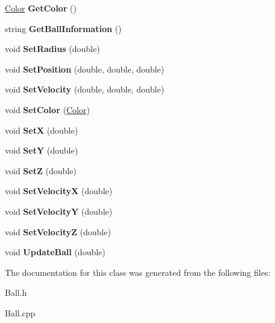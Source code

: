 \begin{DoxyCompactItemize}
\item 
\hypertarget{classBall_a8560830fd50768e3dea23ea6acb805e4}{\hyperlink{classColor}{Color} {\bfseries Get\+Color} ()}\label{classBall_a8560830fd50768e3dea23ea6acb805e4}

\item 
\hypertarget{classBall_a1262df24d9535780d0d1b5e84898873a}{string {\bfseries Get\+Ball\+Information} ()}\label{classBall_a1262df24d9535780d0d1b5e84898873a}

\item 
\hypertarget{classBall_a686405761606ff9cb10f3dec4c15f6c7}{void {\bfseries Set\+Radius} (double)}\label{classBall_a686405761606ff9cb10f3dec4c15f6c7}

\item 
\hypertarget{classBall_a9f7d9dd8c90321127eca7f74cf61898f}{void {\bfseries Set\+Position} (double, double, double)}\label{classBall_a9f7d9dd8c90321127eca7f74cf61898f}

\item 
\hypertarget{classBall_a5ae9588630dacbc7904c455bd5d8cd2a}{void {\bfseries Set\+Velocity} (double, double, double)}\label{classBall_a5ae9588630dacbc7904c455bd5d8cd2a}

\item 
\hypertarget{classBall_a3005173f0433ba7e4a17e3f17e17ad3f}{void {\bfseries Set\+Color} (\hyperlink{classColor}{Color})}\label{classBall_a3005173f0433ba7e4a17e3f17e17ad3f}

\item 
\hypertarget{classBall_ab568ff882cf687755620b05d23fcc0b2}{void {\bfseries Set\+X} (double)}\label{classBall_ab568ff882cf687755620b05d23fcc0b2}

\item 
\hypertarget{classBall_a908bf44a408752a5a57dca7208e88261}{void {\bfseries Set\+Y} (double)}\label{classBall_a908bf44a408752a5a57dca7208e88261}

\item 
\hypertarget{classBall_a605a95d9686caa17e94658ebd80134e2}{void {\bfseries Set\+Z} (double)}\label{classBall_a605a95d9686caa17e94658ebd80134e2}

\item 
\hypertarget{classBall_ac6b233f8bfa2f301639fcc47812a71a5}{void {\bfseries Set\+Velocity\+X} (double)}\label{classBall_ac6b233f8bfa2f301639fcc47812a71a5}

\item 
\hypertarget{classBall_add36cd0acd3a4cfd20c89fdb5ae57c75}{void {\bfseries Set\+Velocity\+Y} (double)}\label{classBall_add36cd0acd3a4cfd20c89fdb5ae57c75}

\item 
\hypertarget{classBall_a070471ba0c171ea46265f37e8c33d353}{void {\bfseries Set\+Velocity\+Z} (double)}\label{classBall_a070471ba0c171ea46265f37e8c33d353}

\item 
\hypertarget{classBall_acad1151201f428ab9d04115fe6e5fce6}{void {\bfseries Update\+Ball} (double)}\label{classBall_acad1151201f428ab9d04115fe6e5fce6}

\end{DoxyCompactItemize}


The documentation for this class was generated from the following files\+:\begin{DoxyCompactItemize}
\item 
Ball.\+h\item 
Ball.\+cpp\end{DoxyCompactItemize}

